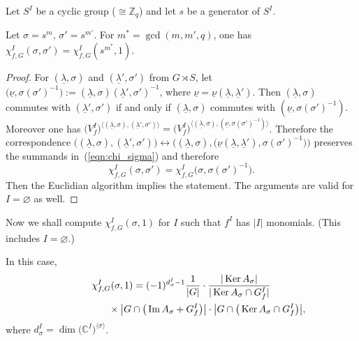 Let $S^I$ be a cyclic group ($\cong {\mathbb Z}_q$) and let $s$ be a generator of $S^I$.

\begin{Proposition} \label{prop:red}
 Let $\sigma=s^m$, $\sigma'=s^{m'}$. For $m^*=\gcd(m, m', q)$, one has
 $\chi_{f,G}^I(\sigma, \sigma')=\chi_{f,G}^I(s^{m^*}, 1)$.
\end{Proposition}

\begin{proof}
 For $(\underline{\lambda},\sigma)$ and $(\underline{\lambda}',\sigma')$ from $G \rtimes S$, let
 $\big(\underline{\nu},\sigma(\sigma')^{-1}\big):=(\underline{\lambda},\sigma)(\underline{\lambda}',\sigma')^{-1}$,
 where $\underline{\nu}=\underline{\nu}(\underline{\lambda},\underline{\lambda}')$. Then
 $(\underline{\lambda},\sigma)$ commutes with $(\underline{\lambda}',\sigma')$ if and only if
 $(\underline{\lambda},\sigma)$ commutes with $(\underline{\nu},\sigma(\sigma')^{-1})$.
 Moreover one has
 $\big(V_f^I\big)^{\langle(\underline{\lambda},\sigma),(\underline{\lambda}',\sigma')\rangle}=
 \big(V_f^I\big)^{\langle(\underline{\lambda},\sigma),(\underline{\nu},\sigma(\sigma')^{-1})\rangle}$.
 Therefore the correspondence
 $\big((\underline{\lambda},\sigma),(\underline{\lambda}',\sigma')\big)\longleftrightarrow
 \big((\underline{\lambda},\sigma),
 \big(\underline{\nu}(\underline{\lambda},\underline{\lambda}'),\sigma(\sigma')^{-1}\big)\big)
 $
 preserves the summands in~(\ref{eqn:chi_sigma}) and therefore
 \[
 \chi_{f,G}^I(\sigma,\sigma')=\chi_{f,G}^I\big(\sigma,\sigma(\sigma')^{-1}\big).
 \]
Then the Euclidian algorithm implies the statement. The arguments are valid for $I=\varnothing$ as well.
\end{proof}

Now we shall compute $\chi_{f,G}^I(\sigma, 1)$ for $I$ such that $f^I$ has $\vert I\vert$ monomials.
(This includes $I=\varnothing$.)

\begin{Proposition} \label{prop:chisigma1}
 In this case,
 \begin{gather}
 \chi_{f,G}^I(\sigma, 1)= (-1)^{d^I_\sigma-1}\frac{1}{\vert G\vert}\cdot
 \frac{\vert \operatorname{Ker}A_{\sigma}\vert}{\vert \operatorname{Ker}A_{\sigma}\cap G^I_f\vert}\nonumber\\
 \hphantom{\chi_{f,G}^I(\sigma, 1)=}{}\times \big\vert G\cap\big(\operatorname{Im}A_{\sigma}+G_f^I\big)\big\vert\cdot\big\vert G\cap\big(\operatorname{Ker}A_{\sigma}\cap G_f^I\big)\big\vert,\label{eqn:chisigma1}
 \end{gather}
 where $d^I_\sigma= \dim\big({\mathbb C}^I\big)^{\langle \sigma \rangle}$.
\end{Proposition}

